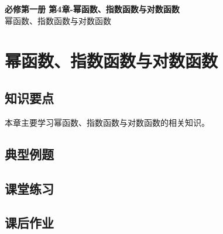 \documentclass[12pt,a4paper]{article}
\begin{document}
\begin{center}
\LARGE\textbf{必修第一册 第4章-幂函数、指数函数与对数函数} \\[0.5em]
\large 幂函数、指数函数与对数函数
\end{center}

\tableofcontents
\newpage

\section{幂函数、指数函数与对数函数}

\subsection{知识要点}
本章主要学习幂函数、指数函数与对数函数的相关知识。

\subsection{典型例题}

\subsection{课堂练习}

\subsection{课后作业}
\end{document}
